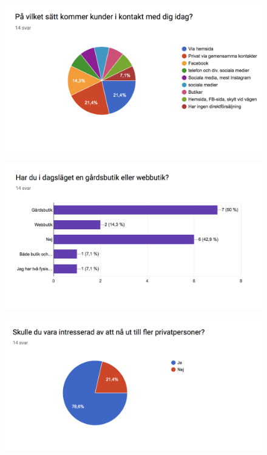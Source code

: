 \documentclass[10pt,a4paper,oneside]{article}
\begin{document}
\begin{figure}
	\includegraphics[scale=0.6]{4.png}
\end{figure}

\begin{figure}
	\includegraphics[scale=0.6]{5.png}
\end{figure}

\begin{figure}
	\includegraphics[scale=0.6]{6.png}
\end{figure}
\end{document}
